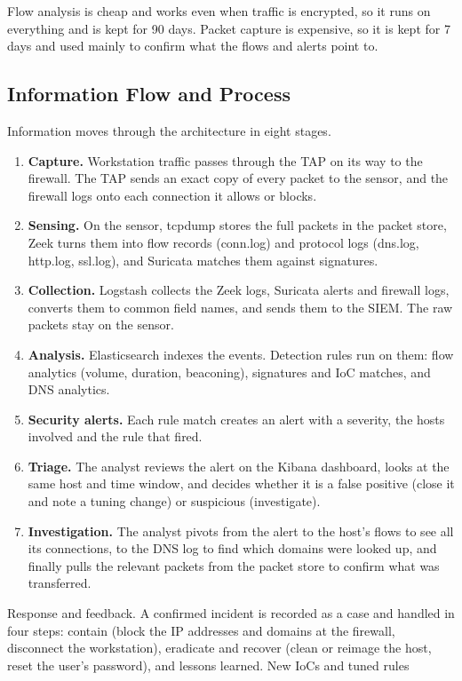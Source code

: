 Flow analysis is cheap and works even when traffic is encrypted, so it runs on everything and is kept for 90 days. Packet capture is expensive, so it is kept for 7 days and used mainly to confirm what the flows and alerts point to.

\subsection{Information Flow and Process}
\label{sec:architecture-flow}

Information moves through the architecture in eight stages.
\begin{enumerate}
  \item \textbf{Capture.} Workstation traffic passes through the TAP on its way to the firewall. The TAP sends an exact copy of every packet to the sensor, and the firewall logs onto each connection it allows or blocks.
  \item \textbf{Sensing.} On the sensor, tcpdump stores the full packets in the packet store, Zeek turns them into flow records (conn.log) and protocol logs (dns.log, http.log, ssl.log), and Suricata matches them against signatures.
  \item \textbf{Collection.} Logstash collects the Zeek logs, Suricata alerts and firewall logs, converts them to common field names, and sends them to the SIEM. The raw packets stay on the sensor.
  \item \textbf{Analysis.} Elasticsearch indexes the events. Detection rules run on them: flow analytics (volume, duration, beaconing), signatures and IoC matches, and DNS analytics.
  \item \textbf{Security alerts.} Each rule match creates an alert with a severity, the hosts involved and the rule that fired.
  \item \textbf{Triage.} The analyst reviews the alert on the Kibana dashboard, looks at the same host and time window, and decides whether it is a false positive (close it and note a tuning change) or suspicious (investigate).
  \item \textbf{Investigation.} The analyst pivots from the alert to the host's flows to see all its connections, to the DNS log to find which domains were looked up, and finally pulls the relevant packets from the packet store to confirm what was transferred.
\end{enumerate}

Response and feedback. A confirmed incident is recorded as a case and handled in four steps: contain (block the IP addresses and domains at the firewall, disconnect the workstation), eradicate and recover (clean or reimage the host, reset the user's password), and lessons learned. New IoCs and tuned rules
